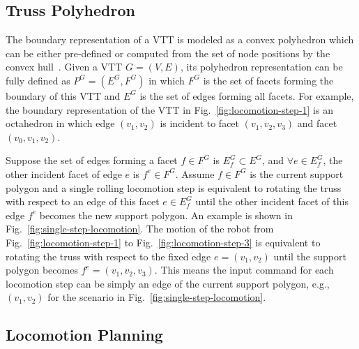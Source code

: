 \documentclass[journal]{IEEEtran}
\begin{document}
\subsection{Truss Polyhedron}
\label{sec:polyhedron}

The boundary representation of a VTT is modeled as a convex polyhedron
which can be either pre-defined or computed from the set of node
positions by the convex hull~\cite{Barber-quickhull-1996}. Given a VTT
$G=(V,E)$, its polyhedron representation can be fully defined as
$P^G=(E^G, F^G)$ in which $F^G$ is the set of facets forming the
boundary of this VTT and $E^G$ is the set of edges forming all
facets. For example, the boundary representation of the VTT in
Fig.~\ref{fig:locomotion-step-1} is an octahedron in which edge
$(v_1, v_2)$ is incident to facet $(v_1, v_2, v_3)$ and facet
$(v_0, v_1, v_2)$.

Suppose the set of edges forming a facet $f\in F^G$ is
$E_f^G\subset E^G$, and $\forall e\in E_f^G$, the other incident facet
of edge $e$ is $f^e\in F^G$. Assume $f\in F^G$ is the current support
polygon and a single rolling locomotion step is equivalent to rotating
the truss with respect to an edge of this facet $e\in E_f^G$ until the
other incident facet of this edge $f^e$ becomes the new support
polygon. An example is shown in
Fig.~\ref{fig:single-step-locomotion}. The motion of the robot from
Fig.~\ref{fig:locomotion-step-1} to Fig.~\ref{fig:locomotion-step-3}
is equivalent to rotating the truss with respect to the fixed edge
$e=(v_1,v_2)$ until the support polygon becomes
$f^e=(v_1,v_2,v_3)$. This means the input command for each locomotion
step can be simply an edge of the current support polygon, e.g.,
$(v_1,v_2)$ for the scenario in Fig.~\ref{fig:single-step-locomotion}.

\subsection{Locomotion Planning}
\label{sec:locomotion-step}
\end{document}
